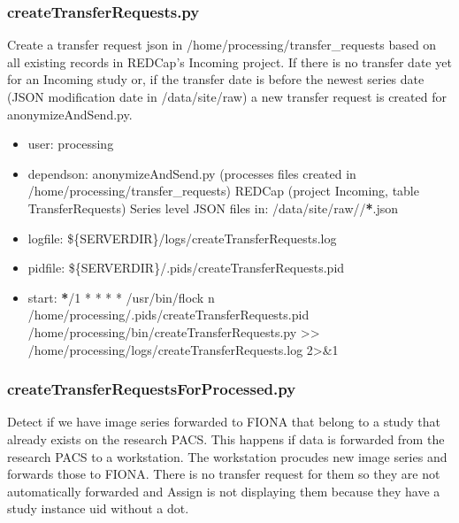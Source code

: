 \documentclass[letterpaper,10pt,english]{sphinxmanual}
\begin{document}
\subsubsection{createTransferRequests.py}
\label{\detokenize{Architecture/scripts/createTransferRequests:createtransferrequests-py}}\label{\detokenize{Architecture/scripts/createTransferRequests::doc}}
\sphinxAtStartPar
Create a transfer request json in /home/processing/transfer\_requests based on all existing records in REDCap’s Incoming project. If there is no transfer date yet for an Incoming study or, if the transfer date is before the newest series date (JSON modification date in /data/site/raw) a new transfer request is created for anonymizeAndSend.py.
\begin{itemize}
\item {} 
\sphinxAtStartPar
user: processing

\item {} 
\sphinxAtStartPar
depends\sphinxhyphen{}on:
\sphinxhyphen{} anonymizeAndSend.py (processes files created in /home/processing/transfer\_requests)
\sphinxhyphen{} REDCap  (project Incoming, table TransferRequests)
\sphinxhyphen{} Series level JSON files in: /data/site/raw/\sphinxstyleemphasis{/}/{\color{red}\bfseries{}*}.json

\item {} 
\sphinxAtStartPar
log\sphinxhyphen{}file:
\sphinxhyphen{} \$\{SERVERDIR\}/logs/createTransferRequests.log

\item {} 
\sphinxAtStartPar
pid\sphinxhyphen{}file: \$\{SERVERDIR\}/.pids/createTransferRequests.pid

\item {} 
\sphinxAtStartPar
start:
{\color{red}\bfseries{}*}/1 * * * *  /usr/bin/flock \sphinxhyphen{}n /home/processing/.pids/createTransferRequests.pid /home/processing/bin/createTransferRequests.py \textgreater{}\textgreater{} /home/processing/logs/createTransferRequests.log 2\textgreater{}\&1

\end{itemize}

\sphinxstepscope


\subsubsection{createTransferRequestsForProcessed.py}
\label{\detokenize{Architecture/scripts/createTransferRequestsForProcessed:createtransferrequestsforprocessed-py}}\label{\detokenize{Architecture/scripts/createTransferRequestsForProcessed::doc}}
\sphinxAtStartPar
Detect if we have image series forwarded to FIONA
that belong to a study that already exists on the research PACS.
This happens if data is forwarded from the research PACS to a
workstation. The workstation procudes new image series and forwards
those to FIONA. There is no transfer request for them so they are not
automatically forwarded and Assign is not displaying them because
they have a study instance uid without a dot.
\end{document}
